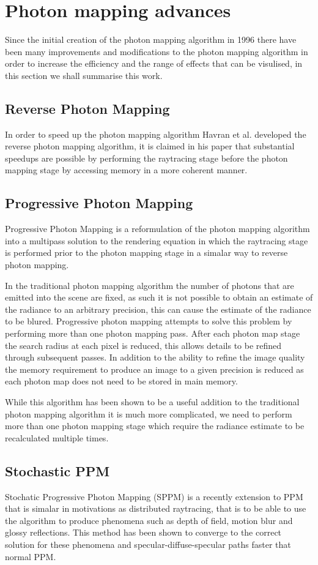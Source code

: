 \section{Photon mapping advances}
Since the initial creation of the photon mapping algorithm in 1996 there have been many improvements
and modifications to the photon mapping algorithm in order to increase the efficiency and the
range of effects that can be visulised, in this section we shall summarise this work.

\subsection{Reverse Photon Mapping}
In order to speed up the photon mapping algorithm Havran et al. developed the reverse photon mapping
algorithm, it is claimed in his paper that substantial speedups are possible by performing the
raytracing stage before the photon mapping stage by accessing memory in a more coherent manner.

\subsection{Progressive Photon Mapping}
Progressive Photon Mapping \cite{Hachisuka08} is a reformulation of the photon mapping algorithm
into a multipass solution to the rendering equation in which the raytracing stage is performed prior
to the photon mapping stage in a simalar way to reverse photon mapping.

In the traditional photon mapping algorithm the number of photons that are emitted into the scene
are fixed, as such it is not possible to obtain an estimate of the radiance to an arbitrary
precision, this can cause the estimate of the radiance to be blured. Progressive photon mapping
attempts to solve this problem by performing more than one photon mapping pass. After each photon
map stage the search radius at each pixel is reduced, this allows details to be refined through
subsequent passes. In addition to the ability to refine the image quality the memory requirement to
produce an image to a given precision is reduced as each photon map does not need to be stored in
main memory.

While this algorithm has been shown to be a useful addition to the traditional photon mapping
algorithm it is much more complicated, we need to perform more than one photon mapping stage which
require the radiance estimate to be recalculated multiple times.

\subsection{Stochastic PPM}
Stochatic Progressive Photon Mapping (SPPM) \cite{Hachisuka09} is a recently extension to PPM that
is simalar in motivations as distributed raytracing, that is to be able to use the algorithm to
produce phenomena such as depth of field, motion blur and glossy reflections. This method has been
shown to converge to the correct solution for these phenomena and specular-diffuse-specular paths
faster that normal PPM.

